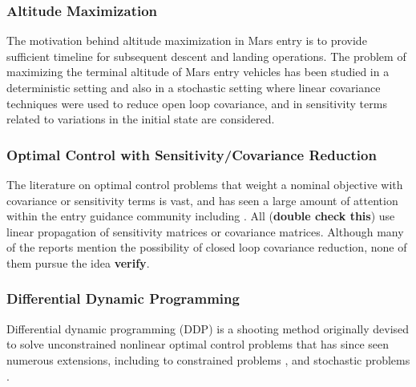 \documentclass[letterpaper, paper,11pt]{AAS}
\begin{document}
\subsubsection{Altitude Maximization}
The motivation behind altitude maximization in Mars entry is to provide sufficient timeline for subsequent descent and landing operations. The problem of maximizing the terminal altitude of Mars entry vehicles has been studied in a deterministic setting
\cite{AltitudeOptimization} %
\cite{AltitudeOptimizationIndirect}
\cite{GuangfeiDissertation}
and also in a stochastic setting \cite{AltitudeUnderUncertainty} where linear covariance techniques were used to reduce open loop covariance, and in \cite{MarsEntryDesensitized} sensitivity terms related to variations in the initial state are considered.
\subsubsection{Optimal Control with Sensitivity/Covariance Reduction}
The literature on optimal control problems that weight a nominal objective with covariance or sensitivity terms is vast, and has seen a large amount of attention within the entry guidance community including 
\cite{AltitudeUnderUncertainty}
\cite{MarsEntryDesensitized}
\cite{EntryOUU} %
\cite{EntryOUUThesis1} %
\cite{EntryOUUThesis2}. %
All (\textbf{double check this}) use linear propagation of sensitivity matrices or covariance matrices. Although many of the reports mention the possibility of closed loop covariance reduction, none of them pursue the idea \textbf{verify}.

\subsubsection{Differential Dynamic Programming}
Differential dynamic programming (DDP) \cite{DDP} is a shooting method originally devised to solve unconstrained nonlinear optimal control problems that has since seen numerous extensions, including to constrained problems \cite{DDP_ControlLimited,HDDP1,HDDP2,DDP_NonlinearConstraints,DDP_InteriorPoint}, and stochastic problems \cite{iLQG, DDP_Stochastic, ozaki_UT,ozaki2020tube}. 
\end{document}
